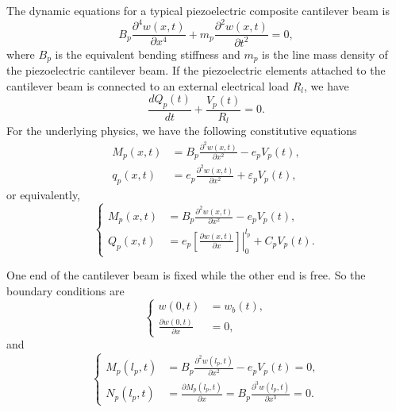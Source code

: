 \documentclass{article}
\begin{document}
The dynamic equations for a typical piezoelectric composite cantilever beam is 
\begin{equation}
    B_p \frac{\partial^4 w(x,t)}{\partial x^4} + m_p \frac{\partial^2 w(x,t)}{\partial t^2} = 0,
\end{equation}
where $B_p$ is the equivalent bending stiffness and $m_p$ is the line mass density of the piezoelectric cantilever beam. If the piezoelectric elements attached to the cantilever beam is connected to an external electrical load $R_l$, we have 
\begin{equation}
    \frac{d Q_p(t)}{d t} + \frac{V_p(t)}{R_l} = 0.
\end{equation}
For the underlying physics, we have the following constitutive equations
\begin{equation}
    \begin{aligned}
        M_p(x,t) &= B_p \frac{\partial^2 w(x,t)}{\partial x^2} - e_p V_p(t), \\
        q_p(x,t) &= e_p \frac{\partial^2 w(x,t)}{\partial x^2} + \varepsilon_p V_p(t),
    \end{aligned}
\end{equation}
or equivalently,
\begin{equation}
    \left\{\begin{aligned}
        M_p(x,t) &= B_p \frac{\partial^2 w(x,t)}{\partial x^2} - e_p V_p(t), \\
        Q_p(x,t) &= e_p \left.\left[ \frac{\partial w(x,t)}{\partial x} \right]\right|_0^{l_p} + C_p V_p(t).
    \end{aligned}\right.
\end{equation}

One end of the cantilever beam is fixed while the other end is free. So the boundary conditions are
\begin{equation}
    \left\{\begin{aligned}
        w(0,t) &= w_b(t), \\
        \frac{\partial w(0,t)}{\partial x} &= 0,
    \end{aligned}\right.
\end{equation}
and
\begin{equation}
    \left\{\begin{aligned}
        M_p(l_p,t) &= B_p \frac{\partial^2 w(l_p,t)}{\partial x^2} - e_p V_p(t) = 0, \\
        N_p(l_p,t) &= \frac{\partial M_p(l_p,t)}{\partial x} = B_p \frac{\partial^3 w(l_p,t)}{\partial x^3} = 0.
    \end{aligned}\right.
\end{equation}
\end{document}
